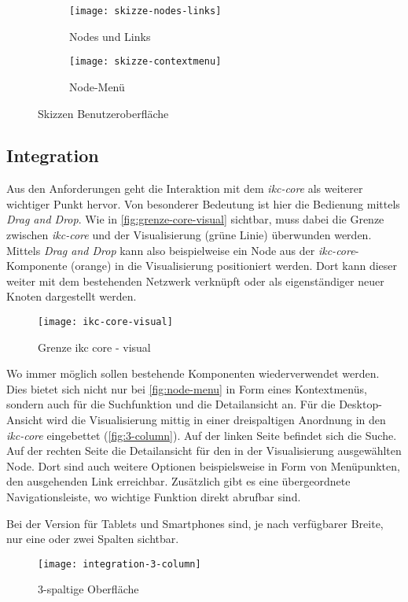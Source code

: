 \begin{figure}[htbp]
\centering
 \begin{subfigure}{0.35\textwidth}
        \centering
        \texttt{[image: skizze-nodes-links]}
        \caption{Nodes und Links}
        \label{fig:nodes-links}
    \end{subfigure}
 \begin{subfigure}{0.35\textwidth}
        \centering
        \texttt{[image: skizze-contextmenu]}
        \caption{Node-Menü}
        \label{fig:node-menu}
    \end{subfigure}
    \caption{Skizzen Benutzeroberfläche}
\end{figure}

\subsection{Integration}

Aus den Anforderungen geht die Interaktion mit dem \textit{ikc-core} als weiterer wichtiger Punkt hervor. Von besonderer Bedeutung ist hier die Bedienung mittels \textit{Drag and Drop}. Wie in \autoref{fig:grenze-core-visual} sichtbar, muss dabei die Grenze zwischen \textit{ikc-core} und der Visualisierung (grüne Linie) überwunden werden. Mittels \textit{Drag and Drop} kann also beispielweise ein Node aus der \textit{ikc-core}-Komponente (orange) in die Visualisierung positioniert werden. Dort kann dieser weiter mit dem bestehenden Netzwerk verknüpft oder als eigenständiger neuer Knoten dargestellt werden.

\begin{figure}[htbp]
\centering
\texttt{[image: ikc-core-visual]}
\caption{Grenze ikc core - visual}
\label{fig:grenze-core-visual}
\end{figure}

Wo immer möglich sollen bestehende Komponenten wiederverwendet werden. Dies bietet sich nicht nur bei \autoref{fig:node-menu} in Form eines Kontextmenüs, sondern auch für die Suchfunktion und die Detailansicht an. Für die Desktop-Ansicht wird die Visualisierung mittig in einer dreispaltigen Anordnung in den \textit{ikc-core} eingebettet (\autoref{fig:3-column}). Auf der linken Seite befindet sich die Suche. Auf der rechten Seite die Detailansicht für den in der Visualisierung ausgewählten Node. Dort sind auch weitere Optionen beispielsweise in Form von Menüpunkten, den ausgehenden Link erreichbar. Zusätzlich gibt es eine übergeordnete Navigationsleiste, wo wichtige Funktion direkt abrufbar sind.

Bei der Version für Tablets und Smartphones sind, je nach verfügbarer Breite, nur eine oder zwei Spalten sichtbar.


\begin{figure}[htbp]
\centering
\texttt{[image: integration-3-column]}
\caption{3-spaltige Oberfläche}
\label{fig:3-column}
\end{figure}